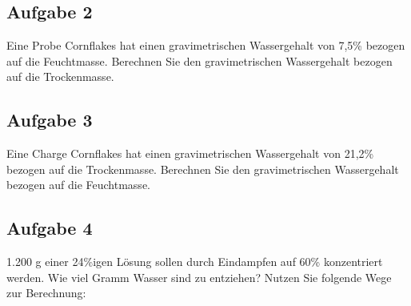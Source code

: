 \documentclass[a4paper,11pt]{article}
\newif\ifshowme
\begin{document}
\subsection*{Aufgabe 2}
Eine Probe Cornflakes hat einen gravimetrischen Wassergehalt von 7,5\% bezogen auf die
Feuchtmasse. Berechnen Sie den gravimetrischen Wassergehalt bezogen auf die
Trockenmasse.

\ifshowme
\antwort{
\begin{align*}
\frac{7,5}{92,5}  \qquad = \qquad 0,081 \qquad \hat{=} \qquad 8,11 \%
\end{align*}

}
\else
\fi


\subsection*{Aufgabe 3}
Eine Charge Cornflakes hat einen gravimetrischen Wassergehalt von 21,2\% bezogen auf die
Trockenmasse. Berechnen Sie den gravimetrischen Wassergehalt bezogen auf die
Feuchtmasse.

\ifshowme
\antwort{
\begin{align*}
\frac{21,2}{121,2} \qquad = \qquad 17,5 \%
\end{align*}
}
\else
\fi



\subsection*{Aufgabe 4}
1.200 g einer 24\%igen Lösung sollen durch Eindampfen auf 60\% konzentriert werden. Wie viel
Gramm Wasser sind zu entziehen? Nutzen Sie folgende Wege zur Berechnung:
\end{document}
